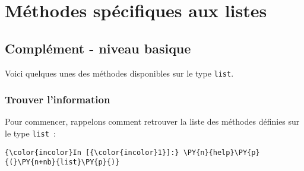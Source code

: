     
    
    
    

    

    \hypertarget{muxe9thodes-spuxe9cifiques-aux-listes}{%
\section{Méthodes spécifiques aux
listes}\label{muxe9thodes-spuxe9cifiques-aux-listes}}

    \hypertarget{compluxe9ment---niveau-basique}{%
\subsection{Complément - niveau
basique}\label{compluxe9ment---niveau-basique}}

    Voici quelques unes des méthodes disponibles sur le type \texttt{list}.

    \hypertarget{trouver-linformation}{%
\subsubsection{Trouver l'information}\label{trouver-linformation}}

    Pour commencer, rappelons comment retrouver la liste des méthodes
définies sur le type \texttt{list}~:

    \begin{Verbatim}[commandchars=\\\{\}]
{\color{incolor}In [{\color{incolor}1}]:} \PY{n}{help}\PY{p}{(}\PY{n+nb}{list}\PY{p}{)}
\end{Verbatim}



